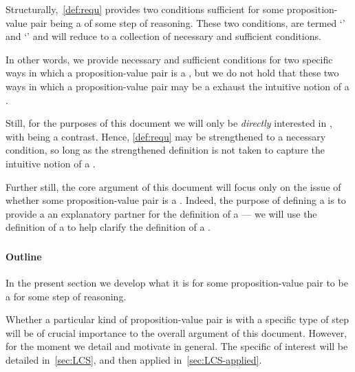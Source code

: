 \begin{note}
  Structurally,~\autoref{def:requ} provides two conditions sufficient for some proposition-value pair being a \requ{} of some step of reasoning.
  These two conditions, are termed `\prequ{}' and `\crequ{}' and will reduce to a collection of necessary and sufficient conditions.

  In other words, we provide necessary and sufficient conditions for two specific ways in which a proposition-value pair is a \requ{}, but we do not hold that these two ways in which a proposition-value pair may be a \requ{} exhaust the intuitive notion of a \requ{}.

  Still, for the purposes of this document we will only be \emph{directly} interested in , with  being a contrast.
  Hence, \autoref{def:requ} may be strengthened to a necessary condition, so long as the strengthened definition is not taken to capture the intuitive notion of a \requ{}.
\end{note}

\begin{note}
  Further still, the core argument of this document will focus only on the issue of whether some proposition-value pair is a .
  Indeed, the purpose of defining a \prequ{} is to provide a an explanatory partner for the definition of a \crequ{} --- we will use the definition of a \prequ{} to help clarify the definition of a \crequ{}.
\end{note}

\subsubsection{}

\paragraph*{Outline}

\begin{note}
  In the present section we develop what it is for some proposition-value pair to be a \crequ{} for some step of reasoning.

  Whether a particular kind of proposition-value pair is \crequ{} with a specific type of step will be of crucial importance to the overall argument of this document.
  However, for the moment we detail and motivate  in general.
  The specific  of interest will be detailed in~\autoref{sec:LCS}, and then applied in~\autoref{sec:LCS-applied}.
\end{note}

